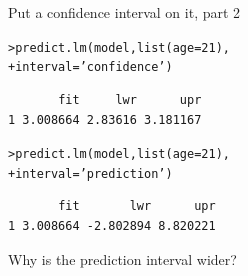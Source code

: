 \documentclass{beamer}\usepackage[]{graphicx}\usepackage[]{color}
\makeatletter
\newcommand{\hlnum}[1]{\textcolor[rgb]{0.824,0.412,0.118}{#1}}%
\newcommand{\hlstr}[1]{\textcolor[rgb]{1,0.894,0.71}{#1}}%
\newcommand{\hlstd}[1]{\textcolor[rgb]{1,0.894,0.769}{#1}}%
\newcommand{\hlkwc}[1]{\textcolor[rgb]{0.78,0.941,0.545}{#1}}%
\newcommand{\hlkwd}[1]{\textcolor[rgb]{1,0.78,0.769}{#1}}%
\newenvironment{kframe}{%
 \def\at@end@of@kframe{}%
 \ifinner\ifhmode%
  \def\at@end@of@kframe{\end{minipage}}%
  \begin{minipage}{\columnwidth}%
 \fi\fi%
 \def\FrameCommand##1{\hskip\@totalleftmargin \hskip-\fboxsep
 \colorbox{shadecolor}{##1}\hskip-\fboxsep
     \hskip-\linewidth \hskip-\@totalleftmargin \hskip\columnwidth}%
 \MakeFramed {\advance\hsize-\width
   \@totalleftmargin\z@ \linewidth\hsize
   \@setminipage}}%
 {\par\unskip\endMakeFramed%
 \at@end@of@kframe}
\newenvironment{knitrout}{}{} %
\makeatother
\begin{document}
\begin{darkframes}
    \begin{frame}[fragile]{Put a confidence interval on it, part 2}

\begin{knitrout}
\begin{kframe}
\begin{alltt}
\hlstd{> }\hlkwd{predict.lm}\hlstd{(model,} \hlkwd{list}\hlstd{(}\hlkwc{age}\hlstd{=}\hlnum{21}\hlstd{),}
\hlstd{+ }  \hlkwc{interval}\hlstd{=}\hlstr{'confidence'}\hlstd{)}
\end{alltt}
\begin{verbatim}
       fit     lwr      upr
1 3.008664 2.83616 3.181167
\end{verbatim}
\begin{alltt}
\hlstd{> }\hlkwd{predict.lm}\hlstd{(model,} \hlkwd{list}\hlstd{(}\hlkwc{age}\hlstd{=}\hlnum{21}\hlstd{),}
\hlstd{+ }  \hlkwc{interval}\hlstd{=}\hlstr{'prediction'}\hlstd{)}
\end{alltt}
\begin{verbatim}
       fit       lwr      upr
1 3.008664 -2.802894 8.820221
\end{verbatim}
\end{kframe}
\end{knitrout}

      \pause
      Why is the prediction interval wider?
      \lc
    \end{frame}

  \end{darkframes}
\end{document}
